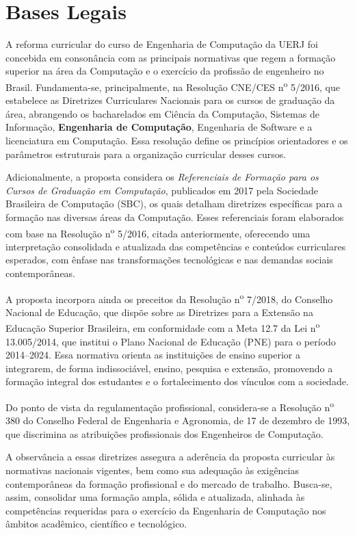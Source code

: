 \chapter{Bases Legais}

A reforma curricular do curso de Engenharia de Computação da UERJ foi concebida em consonância com as principais normativas que regem a formação superior na área da Computação e o exercício da profissão de engenheiro no Brasil. Fundamenta-se, principalmente, na Resolução CNE/CES n\textsuperscript{o} 5/2016, que estabelece as Diretrizes Curriculares Nacionais para os cursos de graduação da área, abrangendo os bacharelados em Ciência da Computação, Sistemas de Informação, \textbf{Engenharia de Computação}, Engenharia de Software e a licenciatura em Computação. Essa resolução define os princípios orientadores e os parâmetros estruturais para a organização curricular desses cursos.

Adicionalmente, a proposta considera os \textit{Referenciais de Formação para os Cursos de Graduação em Computação}, publicados em 2017 pela Sociedade Brasileira de Computação (SBC), os quais detalham diretrizes específicas para a formação nas diversas áreas da Computação. Esses referenciais foram elaborados com base na Resolução n\textsuperscript{o} 5/2016, citada anteriormente, oferecendo uma interpretação consolidada e atualizada das competências e conteúdos curriculares esperados, com ênfase nas transformações tecnológicas e nas demandas sociais contemporâneas.

A proposta incorpora ainda os preceitos da Resolução n\textsuperscript{o} 7/2018, do Conselho Nacional de Educação, que dispõe sobre as Diretrizes para a Extensão na Educação Superior Brasileira, em conformidade com a Meta 12.7 da Lei n\textsuperscript{o} 13.005/2014, que institui o Plano Nacional de Educação (PNE) para o período 2014--2024. Essa normativa orienta as instituições de ensino superior a integrarem, de forma indissociável, ensino, pesquisa e extensão, promovendo a formação integral dos estudantes e o fortalecimento dos vínculos com a sociedade.

Do ponto de vista da regulamentação profissional, considera-se a Resolução n\textsuperscript{o} 380 do Conselho Federal de Engenharia e Agronomia, de 17 de dezembro de 1993, que discrimina as atribuições profissionais dos Engenheiros de Computação.

A observância a essas diretrizes assegura a aderência da proposta curricular às normativas nacionais vigentes, bem como sua adequação às exigências contemporâneas da formação profissional e do mercado de trabalho. Busca-se, assim, consolidar uma formação ampla, sólida e atualizada, alinhada às competências requeridas para o exercício da Engenharia de Computação nos âmbitos acadêmico, científico e tecnológico.

